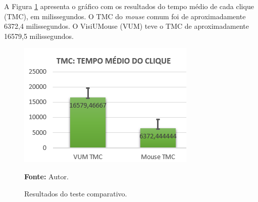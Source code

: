 A Figura \ref{fig:tmc} apresenta o gráfico com os resultados do tempo médio de cada clique (TMC), em milissegundos. O TMC do \textit{mouse} comum foi de aproximadamente 6372,4 milissegundos. O VisiUMouse (VUM) teve o TMC de aproximadamente 16579,5 milissegundos.
\begin{figure}[htbp]
\caption{Resultados do teste comparativo.} 
\centering \includegraphics[scale=1]{img/tmc2.png}

\textbf{Fonte:} Autor.
\label{fig:tmc}
\end{figure}
















